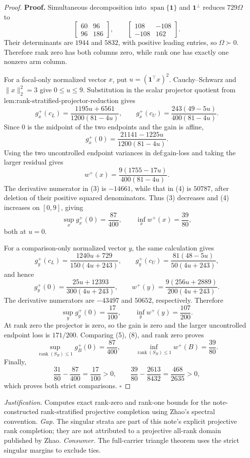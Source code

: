\documentclass{article}
\begin{document}
\begin{proof}
\textbf{Proof.}
Simultaneous decomposition into \(\operatorname{span}\{\mathbf1\}\) and \(\mathbf1^\perp\) reduces \(729\Omega\) to
\[
\begin{bmatrix}60&96\\96&186\end{bmatrix},
\qquad
\begin{bmatrix}108&-108\\-108&162\end{bmatrix}.
\tag{1}
\]
Their determinants are \(1944\) and \(5832\), with positive leading entries, so \(\Omega\succ0\).  Therefore rank zero has both columns zero, while rank one has exactly one nonzero arm column.

For a focal-only normalized vector \(x\), put \(u=(\mathbf1^{\top}x)^2\).  Cauchy--Schwarz and \(\lVert x\rVert_2^2=3\) give \(0\le u\le9\).  Substitution in the scalar projector quotient from lem:rank-stratified-projector-reduction gives
\[
g_x^+(c_L)=\frac{1195u+6561}{1200(81-4u)},
\qquad
g_x^+(c_U)=\frac{243(49-5u)}{400(81-4u)}.
\tag{2}
\]
Since \(0\) is the midpoint of the two endpoints and the gain is affine,
\[
g_x^+(0)=\frac{21141-1225u}{1200(81-4u)}.
\tag{3}
\]
Using the two uncontrolled endpoint variances in def:gain-loss and taking the larger residual gives
\[
w^+(x)=\frac{9(1755-17u)}{400(81-4u)}.
\tag{4}
\]
The derivative numerator in (3) is \(-14661\), while that in (4) is \(50787\), after deletion of their positive squared denominators.  Thus (3) decreases and (4) increases on \([0,9]\), giving
\[
\sup_xg_x^+(0)=\frac{87}{400},
\qquad
\inf_xw^+(x)=\frac{39}{80},
\tag{5}
\]
both at \(u=0\).

For a comparison-only normalized vector \(y\), the same calculation gives
\[
g_y^+(c_L)=\frac{1240u+729}{150(4u+243)},
\qquad
g_y^+(c_U)=\frac{81(48-5u)}{50(4u+243)},
\tag{6}
\]
and hence
\[
g_y^+(0)=\frac{25u+12393}{300(4u+243)},
\qquad
w^+(y)=\frac{9(256u+2889)}{200(4u+243)}.
\tag{7}
\]
The derivative numerators are \(-43497\) and \(50652\), respectively.  Therefore
\[
\sup_yg_y^+(0)=\frac{17}{100},
\qquad
\inf_yw^+(y)=\frac{107}{200}.
\tag{8}
\]
At rank zero the projector is zero, so the gain is zero and the larger uncontrolled endpoint loss is \(171/200\).  Comparing (5), (8), and rank zero proves
\[
\sup_{\operatorname{rank}(S_B)\le1}g_B^+(0)=\frac{87}{400},
\qquad
\inf_{\operatorname{rank}(S_B)\le1}w^+(B)=\frac{39}{80}.
\]
Finally,
\[
\frac{31}{80}-\frac{87}{400}=\frac{17}{100}>0,
\qquad
\frac{39}{80}-\frac{2613}{8432}=\frac{468}{2635}>0,
\]
which proves both strict comparisons.  \(\square\)
\end{proof}
\par\smallskip\noindent \textit{Justification.} Computes exact rank-zero and rank-one bounds for the note-constructed rank-stratified projective completion using Zhao's spectral convention. \textit{Gap.} The singular strata are part of this note's explicit projective rank completion; they are not attributed to a projective all-rank domain published by Zhao. \textit{Consumer.} The full-carrier triangle theorem uses the strict singular margins to exclude ties.
\end{document}
